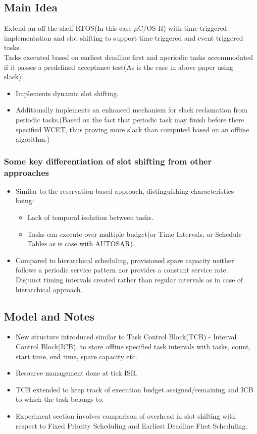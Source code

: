 \subsection*{Main Idea}
Extend an off the shelf RTOS(In this case $\mu$C/OS-II) with time triggered implementation and slot shifting to support time-triggered and event triggered tasks.\\
Tasks executed based on earliest deadline first and aperiodic tasks accommodated  if it passes a predefined acceptance test(As is the case in above paper using slack).
\begin{itemize}
	\item Implements dynamic slot shifting.
	\item Additionally implements an enhanced mechanism for slack reclamation from periodic tasks.(Based on the fact that periodic task may finish before there specified WCET, thus proving more slack than computed based on an offline algorithm.) 
\end{itemize} 
\subsubsection*{Some key differentiation of slot shifting from other approaches}
\begin{itemize}
	\item Similar to the reservation based approach, distinguishing characteristics being:
	\begin{itemize}
		\item Lack of temporal isolation between tasks.
		\item Tasks can execute over multiple budget(or Time Intervals, or Schedule Tables as is case with AUTOSAR).
	\end{itemize}
	\item Compared to hierarchical scheduling, provisioned spare capacity neither follows a periodic service pattern nor provides a constant service rate. Disjunct timing intervals created rather than regular intervals as in case of hierarchical approach.
\end{itemize}
\subsection*{Model and Notes}
\begin{itemize}
	\item New structure introduced similar to Task Control Block(TCB) - Interval Control Block(ICB), to store offline specified task intervals with tasks, count, start time, end time, spare capacity etc.
	\item  Resource management done at tick ISR.
	\item TCB extended to keep track of execution budget assigned/remaining and ICB to which the task belongs to.
	\item Experiment section involves comparison of overhead in slot shifting with respect to Fixed Priority Scheduling and Earliest Deadline First Scheduling.
\end{itemize}
